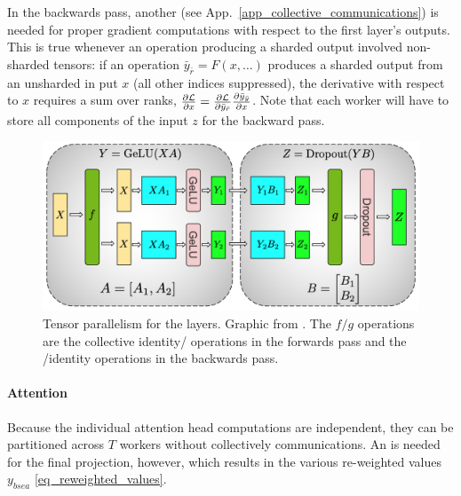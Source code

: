 \documentclass[11pt]{article}
\begin{document}
In the backwards pass, another  (see App.~\ref{app_collective_communications})
is needed for proper gradient computations with respect to the first  layer's
outputs. This is true whenever an operation producing a sharded output involved non-sharded tensors:
if an operation $ \bar{y}_{ \bar{r} }  = F(x, \ldots) $ produces a sharded output from an unsharded
in put $ x $ (all other indices suppressed), the derivative with respect to $ x $ requires a sum
over ranks, $ \frac{ \partial \mathcal{L} }{ \partial x } = \frac{ \partial \mathcal{L} }{ \partial \bar{y} _{
\bar{r} }  } \frac{ \partial \bar{y} _{ \bar{y} } }{ \partial x  }$. Note that each worker will have
to store all components of the input $ z $ for the backward pass.



\begin{figure}[ht]
	\centering
	\includegraphics[scale=.33]{figures/mlp_mp_2.png}
	\caption{Tensor parallelism for the  layers. Graphic from
		\cite{shoeybi2020megatronlm}. The $ f/g $ operations are the collective
		identity/ operations in the forwards pass and the /identity
		operations in the backwards pass.}
	\label{fig_mlp_tensor_parallel}
\end{figure}


\paragraph{Attention} Because the individual attention head computations are independent, they can
be partitioned across $ T $ workers without collectively communications.  An  is
needed for the final projection, however, which results in the various re-weighted values $ y _{
bsea } $ \eqref{eq_reweighted_values}.
\end{document}
